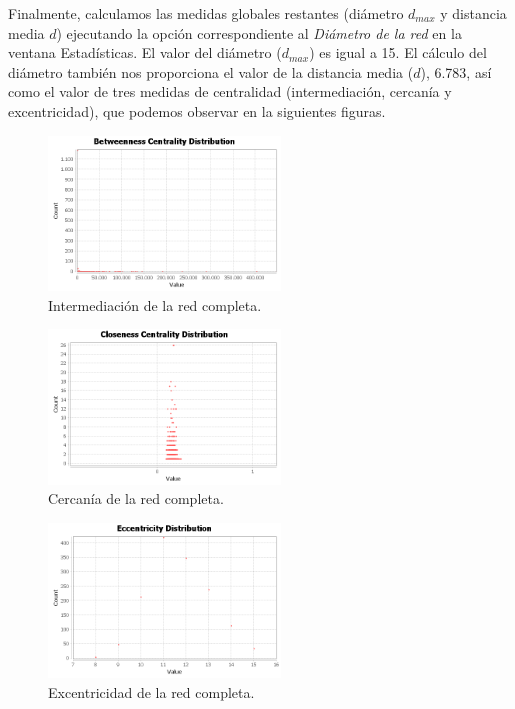 \documentclass{uimppracticas}
\begin{document}
Finalmente, calculamos las medidas globales restantes (diámetro $d_{max}$ y distancia media $d$) ejecutando la opción correspondiente al \textit{Diámetro de la red} en la ventana {Estadísticas}. El valor del diámetro ($d_{max}$) es igual a 15. El cálculo del diámetro también nos proporciona el valor de la distancia media ($d$), 6.783, así como el valor de tres medidas de centralidad (intermediación, cercanía y excentricidad), que podemos observar en la siguientes figuras.

\begin{figure}[H]
	\centering
	\includegraphics[width=0.55\textwidth]{images/Betweenness-Centrality-Distribution}
	\caption{Intermediación de la red completa.}
	\label{Betweenness-Centrality-Distribution}
\end{figure}

\begin{figure}[H]
	\centering
	\includegraphics[width=0.55\textwidth]{images/Closeness-Centrality-Distribution}
	\caption{Cercanía de la red completa.}
	\label{Closeness-Centrality-Distribution}
\end{figure}

\begin{figure}[H]
	\centering
	\includegraphics[width=0.55\textwidth]{images/Eccentricity-Distribution}
	\caption{Excentricidad de la red completa.}
	\label{Eccentricity-Distribution}
\end{figure}
\end{document}
